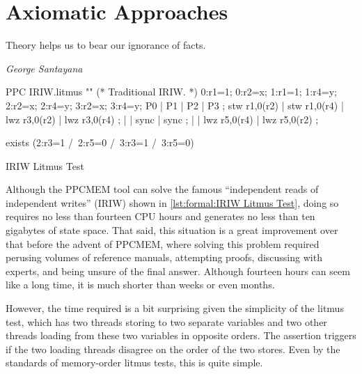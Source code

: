
\section{Axiomatic Approaches}
\label{sec:formal:Axiomatic Approaches}
%
\epigraph{Theory helps us to bear our ignorance of facts.}
	{\emph{George Santayana}}

\begin{listing}
\begin{fcvlabel}
\begin{VerbatimL}[commandchars=\%\@\$]
PPC IRIW.litmus
""
(* Traditional IRIW. *)
{
0:r1=1; 0:r2=x;
1:r1=1;         1:r4=y;
        2:r2=x; 2:r4=y;
        3:r2=x; 3:r4=y;
}
P0           | P1           | P2           | P3           ;
stw r1,0(r2) | stw r1,0(r4) | lwz r3,0(r2) | lwz r3,0(r4) ;
             |              | sync         | sync         ;
             |              | lwz r5,0(r4) | lwz r5,0(r2) ;

exists
(2:r3=1 /\ 2:r5=0 /\ 3:r3=1 /\ 3:r5=0)
\end{VerbatimL}
\end{fcvlabel}
\caption{IRIW Litmus Test}
\label{lst:formal:IRIW Litmus Test}
\end{listing}

Although the PPCMEM tool can solve the famous ``independent reads of
independent writes'' (IRIW)  shown in
\cref{lst:formal:IRIW Litmus Test}, doing so requires no less than
fourteen CPU hours and generates no less than ten gigabytes of state space.
That said, this situation is a great improvement over that before the advent
of PPCMEM, where solving this problem required perusing volumes of
reference manuals, attempting proofs, discussing with experts, and
being unsure of the final answer.
Although fourteen hours can seem like a long time, it is much shorter
than weeks or even months.

However, the time required is a bit surprising given the simplicity
of the litmus test, which has two threads storing to two separate variables
and two other threads loading from these two variables in opposite
orders.
The assertion triggers if the two loading threads disagree on the order
of the two stores.
Even by the standards of memory-order litmus tests, this is quite simple.

